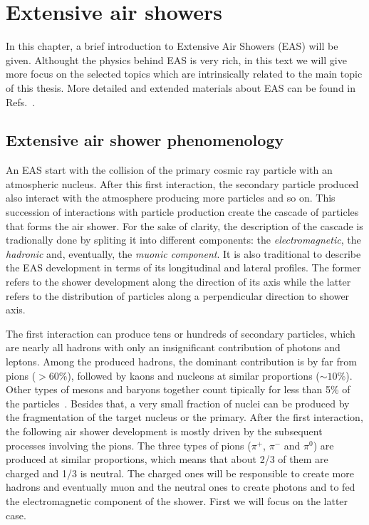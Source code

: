 \chapter[Extensive air showers and UHECR composition]{Extensive air showers}
\label{sec:showers}

In this chapter, a brief introduction to Extensive Air Showers (EAS)
will be given. Althought the physics behind EAS is very rich,
in this text we will give more focus on the selected topics
which are intrinsically related to the main topic of this thesis.
More detailed and extended materials about EAS can be found
in Refs.~\cite{GaisserBook,GriederBook}.


\section{Extensive air shower phenomenology}
\label{sec:showers:phen}

An EAS start with the collision of the primary cosmic ray particle
with an atmospheric nucleus. After this first interaction, the secondary
particle produced also interact with the atmosphere producing more
particles and so on. This succession of interactions with particle production
create the cascade of particles that forms the air shower.
For the sake of clarity, the description of the cascade is tradionally
done by spliting it into different components: the \emph{electromagnetic},
the \emph{hadronic} and, eventually, the \emph{muonic component}. It is also traditional
to describe the EAS development in terms of its longitudinal and lateral profiles.
The former refers to the shower development along the direction of its axis
while the latter refers to the distribution of particles
along a perpendicular direction to shower axis.


The first interaction can produce tens or hundreds of
secondary particles, which are nearly all hadrons
with only an insignificant contribution of photons and leptons.
Among the produced hadrons, the dominant contribution is by far from pions ($>60\%$),
followed by kaons and nucleons at similar proportions ($\sim 10\%$). Other
types of mesons and baryons together count tipically for less than 5\% of
the particles~\cite{Calcagni:2017tws}.
Besides that, a very small fraction of nuclei can be produced
by the fragmentation of the target nucleus or the primary.
After the first interaction, the following air shower development is mostly driven
by the subsequent processes involving the pions. The three types of pions ($\pi^+$, $\pi^-$ and $\pi^0$)
are produced at similar proportions, which means that about 2/3 of them are charged and
1/3 is neutral. The charged ones will be responsible to create more
hadrons and eventually muon and the neutral ones to create photons and
to fed the electromagnetic component of the shower.
First we will focus on the latter case.

